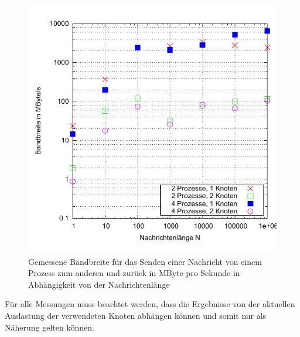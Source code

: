 \begin{figure}[htb]
  \centering
  \includegraphics[width=0.8\columnwidth,keepaspectratio]{../tmp/bandbreite}
  \caption{Gemessene Bandbreite für das Senden einer Nachricht von einem Prozess zum
  anderen und zurück in MByte pro Sekunde in Abhängigkeit von der Nachrichtenlänge}
  \label{fig:bandbreite}
\end{figure}

Für alle Messungen muss beachtet werden, dass die Ergebnisse von der aktuellen Auslastung
der verwendeten Knoten abhängen können und somit nur als Näherung gelten können.